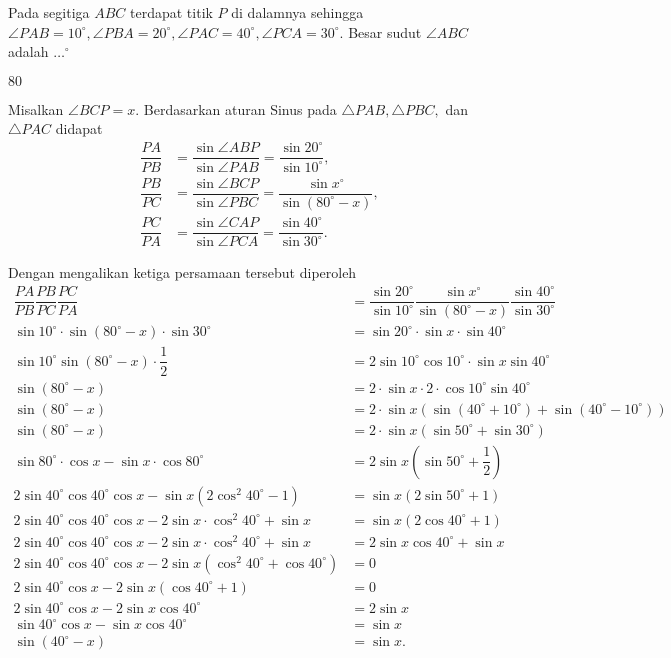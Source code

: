 \documentclass[11pt]{scrartcl}
\begin{document}
	\begin{soalbaru}
		Pada segitiga $ABC$ terdapat titik $P$ di dalamnya sehingga $\angle PAB = 10^\circ, \angle PBA = 20^\circ , \angle PAC = 40^\circ, \angle PCA = 30^\circ$. Besar sudut $\angle ABC$ adalah $\dots^\circ$ 
		
		\begin{jawaban}
				$80$
		\end{jawaban}
		\begin{solusi}
		Misalkan $\angle BCP = x$. Berdasarkan aturan Sinus pada $\triangle PAB, \triangle PBC,$ dan $\triangle PAC$ didapat
		\begin{align*}
		\dfrac{PA}{PB} &= \dfrac{\sin \angle ABP}{\sin \angle PAB} = \dfrac{\sin 20^\circ}{\sin 10^\circ}, \\
		\dfrac{PB}{PC} &= \dfrac{\sin \angle BCP}{\sin \angle PBC} = \dfrac{\sin x^\circ}{\sin (80
		^\circ-x)}, \\
		\dfrac{PC}{PA} &= \dfrac{\sin \angle CAP}{\sin \angle PCA} = \dfrac{\sin 40^\circ}{\sin 30^\circ}.
		\end{align*}
		
		Dengan mengalikan ketiga persamaan tersebut diperoleh
		\begin{align*}
		\dfrac{PA}{PB}\dfrac{PB}{PC}\dfrac{PC}{PA}&=\dfrac{\sin 20^\circ}{\sin 10^\circ}\dfrac{\sin x^\circ}{\sin (80^\circ-x)}\dfrac{\sin 40^\circ}{\sin 30^\circ}\\
		\sin 10^\circ \cdot \sin (80^\circ-x)\cdot \sin 30^\circ &= \sin 20^\circ\cdot \sin x \cdot \sin 40^\circ\\
		\sin 10^\circ \sin (80^\circ-x)\cdot \dfrac{1}{2}&=2\sin 10^\circ \cos 10^\circ\cdot \sin x \sin 40^\circ\\
		\sin (80^\circ-x)&=2\cdot\sin x \cdot 2\cdot \cos 10^\circ \sin 40^\circ\\
		\sin(80^\circ-x)&=2\cdot\sin x(\sin(40^\circ+10^\circ)+\sin(40^\circ-10^\circ))\\
		\sin(80^\circ-x)&=2\cdot\sin x(\sin50^\circ+\sin 30^\circ)\\
		\sin 80^\circ\cdot\cos x-\sin x\cdot \cos 80^\circ &= 2\sin x(\sin 50^\circ +\dfrac{1}{2})\\
		2\sin40^\circ\cos 40^\circ\cos x-\sin x(2\cos^2 40^\circ-1)&=\sin x(2\sin 50^\circ+1)\\
		2\sin40^\circ\cos 40^\circ\cos x-2\sin x\cdot\cos^2 40^\circ+\sin x &= \sin x (2 \cos 40^\circ+1)\\
		2\sin40^\circ\cos 40^\circ\cos x-2\sin x\cdot\cos^2 40^\circ+\sin x &= 2\sin x\cos 40^\circ + \sin x\\
		2\sin40^\circ\cos 40^\circ\cos x-2\sin x(\cos^2 40^\circ+\cos 40^\circ) &= 0\\
		2 \sin 40^\circ \cos x - 2\sin x(\cos 40^\circ+1)&=0\\
		2\sin 40^\circ\cos x-2\sin x\cos 40^\circ &= 2\sin x\\
		\sin 40^\circ\cos x-\sin x\cos 40^\circ &= \sin x\\
		\sin(40^\circ-x)&=\sin x. 
		\end{align*}
		

\end{solusi}
\end{soalbaru}
\end{document}
